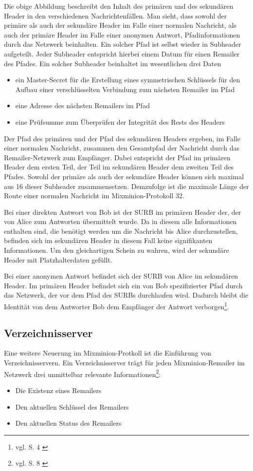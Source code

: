 Die obige Abbildung beschreibt den Inhalt des primären und des sekundären Header in den verschiedenen Nachrichtenfällen.
Man sieht, dass sowohl der primäre als auch der sekundäre Header im Falle einer normalen Nachricht, als auch der primäre Header im Falle einer anonymen Antwort, Pfadinformationen durch das Netzwerk beinhalten.
Ein solcher Pfad ist selbst wieder in Subheader aufgeteilt. Jeder Subheader entspricht hierbei einem Datum für einen Remailer des Pfades. Ein solcher Subheader beinhaltet im wesentlichen drei Daten
\begin{itemize}
\item ein Master-Secret für die Erstellung eines symmetrischen Schlüssels für den Aufbau einer verschlüsselten Verbindung zum nächsten Remailer im Pfad
\item eine Adresse des nächsten Remailers im Pfad
\item eine Prüfsumme zum Überprüfen der Integrität des Rests des Headers
\end{itemize}
Der Pfad des primären und der Pfad des sekundären Headers ergeben, im Falle einer normalen Nachricht, zusammen den Gesamtpfad der Nachricht durch das Remailer-Netzwerk zum Empfänger. Dabei entspricht der Pfad im primären Header dem ersten Teil, der Teil im sekundären Header dem zweiten Teil des Pfades.
Sowohl der primäre als auch der sekundäre Header können sich maximal aus 16 dieser Subheader zusammensetzen. Demzufolge ist die maximale Länge der Route einer normalen Nachricht im Mixminion-Protokoll 32.

Bei einer direkten Antwort von Bob ist der SURB im primären Header der, der von Alice zum Antworten übermittelt wurde. Da in diesem alle Informationen enthalten sind, die benötigt werden um die Nachricht bis Alice durchzustellen, befinden sich im sekundären Header in diesem Fall keine signifikanten Informationen. Um den gleichartigen Schein zu wahren, wird der sekundäre Header mit Platzhalterdaten gefüllt.

Bei einer anonymen Antwort befindet sich der SURB von Alice im sekundären Header. Im primären Header befindet sich ein von Bob spezifizierter Pfad durch das Netzwerk, der vor dem Pfad des SURBs durchlaufen wird. Dadurch bleibt die Identität von dem Antworter Bob dem Empfänger der Antwort verborgen\footnote{vgl. S. 4 \cite{mixminion}}.

\subsection{Verzeichnisserver}
Eine weitere Neuerung im Mixminion-Protkoll ist die Einführung von Verzeichnisservern. Ein Verzeichnisserver trägt für jeden Mixminion-Remailer im Netzwerk drei unmittelbar relevante Informationen\footnote{vgl. S. 8 \cite{mixminion}}:
\begin{itemize}
\item Die Existenz eines Remailers
\item Den aktuellen Schlüssel des Remailers
\item Den aktuellen Status des Remailers
\end{itemize}

